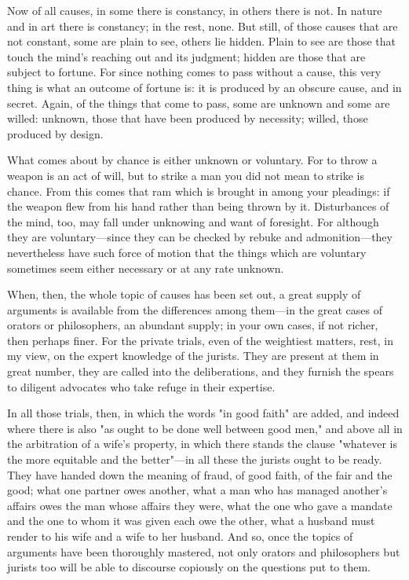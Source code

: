  Now of all causes, in some there is constancy, in others there is not. In nature and in art there is constancy; in the rest, none. But still, of those causes that are not constant, some are plain to see, others lie hidden. Plain to see are those that touch the mind's reaching out and its judgment; hidden are those that are subject to fortune. For since nothing comes to pass without a cause, this very thing is what an outcome of fortune is: it is produced by an obscure cause, and in secret. Again, of the things that come to pass, some are unknown and some are willed: unknown, those that have been produced by necessity; willed, those produced by design.

 What comes about by chance is either unknown or voluntary. For to throw a weapon is an act of will, but to strike a man you did not mean to strike is chance. From this comes that ram which is brought in among your pleadings: if the weapon flew from his hand rather than being thrown by it. Disturbances of the mind, too, may fall under unknowing and want of foresight. For although they are voluntary—since they can be checked by rebuke and admonition—they nevertheless have such force of motion that the things which are voluntary sometimes seem either necessary or at any rate unknown.

 When, then, the whole topic of causes has been set out, a great supply of arguments is available from the differences among them—in the great cases of orators or philosophers, an abundant supply; in your own cases, if not richer, then perhaps finer. For the private trials, even of the weightiest matters, rest, in my view, on the expert knowledge of the jurists. They are present at them in great number, they are called into the deliberations, and they furnish the spears to diligent advocates who take refuge in their expertise.

 In all those trials, then, in which the words "in good faith" are added, and indeed where there is also "as ought to be done well between good men," and above all in the arbitration of a wife's property, in which there stands the clause "whatever is the more equitable and the better"—in all these the jurists ought to be ready. They have handed down the meaning of fraud, of good faith, of the fair and the good; what one partner owes another, what a man who has managed another's affairs owes the man whose affairs they were, what the one who gave a mandate and the one to whom it was given each owe the other, what a husband must render to his wife and a wife to her husband. And so, once the topics of arguments have been thoroughly mastered, not only orators and philosophers but jurists too will be able to discourse copiously on the questions put to them.

